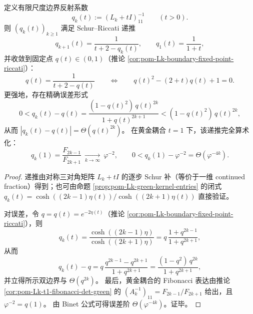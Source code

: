 \begin{proposition}\label{prop:pom-Lk-boundary-riccati-recursion}
定义有限尺度边界反射系数
\[
q_k(t):=(L_k+tI)^{-1}_{11}\qquad(t>0).
\]
则 \((q_k(t))_{k\ge 1}\) 满足 Schur--Riccati 递推
\[
q_{k+1}(t)=\frac{1}{t+2-q_k(t)},\qquad q_1(t)=\frac{1}{1+t},
\]
并收敛到固定点 \(q(t)\in(0,1)\)（推论 \ref{cor:pom-Lk-boundary-fixed-point-riccati}）：
\[
q(t)=\frac{1}{t+2-q(t)}\qquad\Longleftrightarrow\qquad q(t)^2-(2+t)q(t)+1=0.
\]
更强地，存在精确误差形式
\[
0<q_k(t)-q(t)=\frac{(1-q(t)^2)\,q(t)^{2k}}{1+q(t)^{2k+1}}
< (1-q(t)^2)\,q(t)^{2k},
\]
从而 \(|q_k(t)-q(t)|=\Theta(q(t)^{2k})\)。
在黄金耦合 \(t=1\) 下，该递推完全算术化：
\[
q_k(1)=\frac{F_{2k-1}}{F_{2k+1}}\ \xrightarrow[k\to\infty]{}\ \varphi^{-2},
\qquad
0<q_k(1)-\varphi^{-2}=\Theta(\varphi^{-4k}).
\]
\end{proposition}
\begin{proof}
递推由对称三对角矩阵 \(L_k+tI\) 的逐步 Schur 补（等价于一维 continued fraction）得到；也可由命题 \ref{prop:pom-Lk-green-kernel-entries} 的闭式 \(q_k(t)=\cosh((2k-1)\eta(t))/\cosh((2k+1)\eta(t))\) 直接验证。

对误差，令 \(q=q(t)=e^{-2\eta(t)}\)（推论 \ref{cor:pom-Lk-boundary-fixed-point-riccati}），则
\[
q_k(t)=\frac{\cosh((2k-1)\eta)}{\cosh((2k+1)\eta)}
=q\,\frac{1+q^{2k-1}}{1+q^{2k+1}},
\]
从而
\[
q_k(t)-q=q\,\frac{q^{2k-1}-q^{2k+1}}{1+q^{2k+1}}
=\frac{(1-q^2)\,q^{2k}}{1+q^{2k+1}},
\]
并立得所示双边界与 \(\Theta(q^{2k})\)。
最后，黄金耦合的 Fibonacci 表达由推论 \ref{cor:pom-Lk-t1-fibonacci-det-green} 的 \((A_k^{-1})_{11}=F_{2k-1}/F_{2k+1}\) 给出，且 \(\varphi^{-2}=q(1)\)。
由 Binet 公式可得误差阶 \(\Theta(\varphi^{-4k})\)。证毕。
\end{proof}

